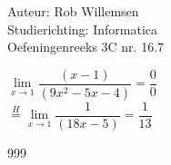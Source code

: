 \documentclass[a4paper]{article}
\newcommand{\limit}{\lim\limits}
\begin{document}
\noindent \large Auteur: Rob Willemsen \\
\noindent \large Studierichting: Informatica \\
\noindent \large Oefeningenreeks 3C nr. 16.7 \\

\medskip

\normalsize

$\limit_{x \rightarrow 1} \dfrac{(x-1)}{(9x^2-5x-4)} = \dfrac{0}{0}$\\

$\overset{H}{=}\limit_{x \rightarrow 1} \dfrac{1}{(18x-5)} = \dfrac{1}{13}$\\

\begin{thebibliography}{999}
\end{thebibliography}
\end{document}

